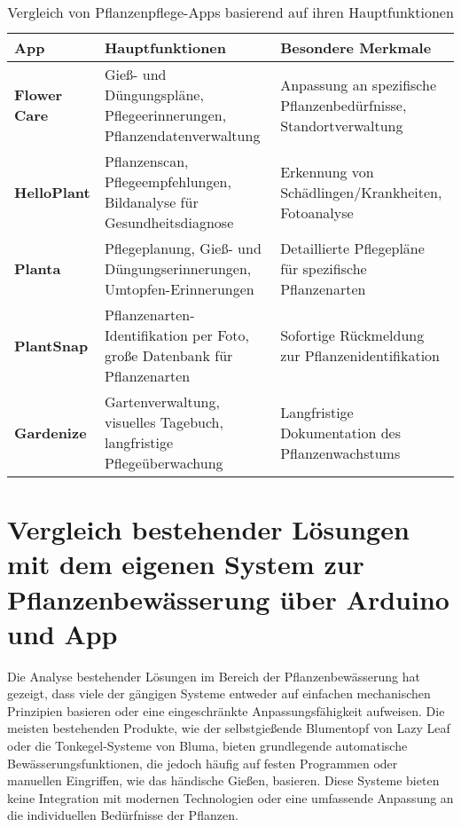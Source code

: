 \begin{table}[H]
	\centering
	\caption{Vergleich von Pflanzenpflege-Apps basierend auf ihren Hauptfunktionen \cite{arslan5BestenHandyApps}}
	\label{tab:app_compare}
	\begin{tabularx}{\textwidth}{|>{\raggedright\arraybackslash}p{}|X|X|}
		\hline
		\textbf{App}           & \textbf{Hauptfunktionen}                                                                & \textbf{Besondere Merkmale}                                           \\ \hline
		\textbf{Flower Care}    & Gieß- und Düngungspläne, Pflegeerinnerungen, Pflanzendatenverwaltung                    & Anpassung an spezifische Pflanzenbedürfnisse, Standortverwaltung     \\ \hline
		\textbf{HelloPlant}     & Pflanzenscan, Pflegeempfehlungen, Bildanalyse für Gesundheitsdiagnose                   & Erkennung von Schädlingen/Krankheiten, Fotoanalyse                   \\ \hline
		\textbf{Planta}         & Pflegeplanung, Gieß- und Düngungserinnerungen, Umtopfen-Erinnerungen                     & Detaillierte Pflegepläne für spezifische Pflanzenarten               \\ \hline
		\textbf{PlantSnap}      & Pflanzenarten-Identifikation per Foto, große Datenbank für Pflanzenarten                & Sofortige Rückmeldung zur Pflanzenidentifikation                      \\ \hline
		\textbf{Gardenize}      & Gartenverwaltung, visuelles Tagebuch, langfristige Pflegeüberwachung                     & Langfristige Dokumentation des Pflanzenwachstums                      \\ \hline
	\end{tabularx}
\end{table}



\section{Vergleich bestehender Lösungen mit dem eigenen System zur Pflanzenbewässerung über Arduino und App}

Die Analyse bestehender Lösungen im Bereich der Pflanzenbewässerung hat gezeigt, dass viele der gängigen Systeme entweder auf einfachen mechanischen Prinzipien basieren oder eine eingeschränkte Anpassungsfähigkeit aufweisen. Die meisten bestehenden Produkte, wie der selbstgießende Blumentopf von Lazy Leaf oder die Tonkegel-Systeme von Bluma, bieten grundlegende automatische Bewässerungsfunktionen, die jedoch häufig auf festen Programmen oder manuellen Eingriffen, wie das händische Gießen, basieren. Diese Systeme bieten keine Integration mit modernen Technologien oder eine umfassende Anpassung an die individuellen Bedürfnisse der Pflanzen.

